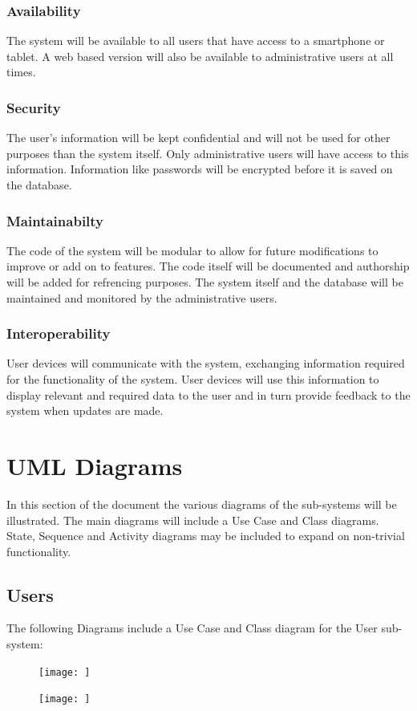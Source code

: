 \documentclass{article}
\begin{document}
		\subsubsection{Availability}
		The system will be available to all users that have access to a smartphone or tablet. A web based version will also be available to administrative users at all times.
		\subsubsection{Security}
		The user's information will be kept confidential and will not be used for other purposes than the system itself. Only administrative users will have access to this information. Information like passwords will be encrypted before it is saved on the database.
		\subsubsection{Maintainabilty}
		The code of the system will be modular to allow for future modifications to improve or add on to features. The code itself will be documented and authorship will be added for refrencing purposes. The system itself and the database will be maintained and monitored by the administrative users.
		\subsubsection{Interoperability}
		User devices will communicate with the system, exchanging information required for the functionality of the system. User devices will use this information to display relevant and required data to the user and in turn provide feedback to the system when updates are made.

\section{UML Diagrams}
In this section of the document the various diagrams of the sub-systems will be illustrated. The main diagrams will include a Use Case and Class diagrams. State, Sequence and Activity diagrams may be included to expand on non-trivial functionality.
	\subsection{Users}
	The following Diagrams include a Use Case and Class diagram for the User sub-system:
	\begin{figure}[h]
  		\texttt{[image: ]}
	\end{figure}
	\begin{figure}[h]
  		\texttt{[image: ]}
	\end{figure}
	
\end{document}
